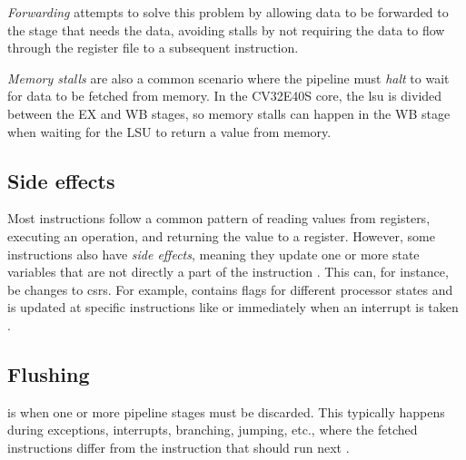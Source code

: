 \textit{Forwarding} attempts to solve this problem by allowing data to be forwarded to the stage that needs the data, avoiding stalls by not requiring the data to flow through the register file to a subsequent instruction.

\textit{Memory stalls} are also a common scenario where the pipeline must \textit{halt} to wait for data to be fetched from memory. In the CV32E40S core, the \acrshort{lsu} is divided between the EX and WB stages, so memory stalls can happen in the WB stage when waiting for the LSU to return a value from memory.


\subsection{Side effects}

Most instructions follow a common pattern of reading values from registers, executing an operation, and returning the value to a register.
However, some instructions also have \textit{side effects}, meaning they update one or more state variables that are not directly a part of the instruction \cite{taylorAdvancedRISCVVerification2023}. This can, for instance, be changes to \acrshort{csr}s. For example,  contains flags for different processor states and is updated at specific instructions like  or immediately when an interrupt is taken \cite{openhwgroupExceptionsInterruptsCOREV2023}. 


%

\subsection{Flushing}

 is when one or more pipeline stages must be discarded. This typically happens during exceptions, interrupts, branching, jumping, etc., where the fetched instructions differ from the instruction that should run next \cite{pattersonComputerOrganizationDesign2021}.

